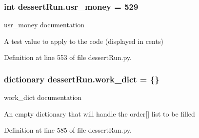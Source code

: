 \hypertarget{namespacedessertRun_af6e2ea6ab3f9e528fbd53b37d154aabd}{
\subsubsection[{usr\-\_\-money}]{\setlength{\rightskip}{0pt plus 5cm}int dessert\-Run.\-usr\-\_\-money = 529}}\label{namespacedessertRun_af6e2ea6ab3f9e528fbd53b37d154aabd}


usr\-\_\-money documentation 

A test value to apply to the code (displayed in cents) 

Definition at line 553 of file dessert\-Run.\-py.

\hypertarget{namespacedessertRun_acc6c32059977bfad8131949a82cc4590}{
\subsubsection[{work\-\_\-dict}]{\setlength{\rightskip}{0pt plus 5cm}dictionary dessert\-Run.\-work\-\_\-dict = \{\}}}\label{namespacedessertRun_acc6c32059977bfad8131949a82cc4590}


work\-\_\-dict documentation 

An empty dictionary that will handle the order\mbox{[}\mbox{]} list to be filled 

Definition at line 585 of file dessert\-Run.\-py.

